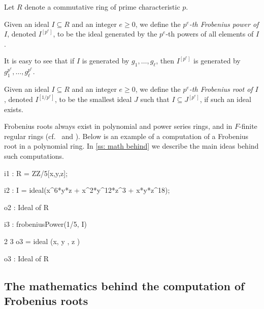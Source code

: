 \documentclass{amsart}
\renewcommand{\geq}{\geqslant}
\begin{document}
Let $R$ denote a commutative ring of prime characteristic $p$.

\begin{definition}
Given an ideal $I\subseteq R$ and an integer $e\geq 0$, we define the \emph{$p^e$-th Frobenius power of $I$}, denoted $I^{[p^e]}$, to be the ideal
generated by the $p^e$-th powers of all elements of $I$.
\end{definition}

It is easy to see that if $I$ is generated by $g_1, \dots, g_\ell$, then $I^{[p^e]}$ is generated by $g_1^{p^e}, \dots, g_\ell^{p^e}$.


\begin{definition}
Given an ideal $I\subseteq R$ and an integer $e\geq 0$, we define the \emph{$p^e$-th Frobenius root of $I$}, denoted $I^{[1/p^{e}]}$, to be the smallest ideal $J$ such that $I\subseteq J^{[p^e]}$, if such an ideal exists.
\end{definition}

Frobenius roots always exist in polynomial and power series rings, and in $F$-finite regular rings
(cf.~\cite[\S 2]{BlickleMustataSmithDiscretenessAndRationalityOfFThresholds} and \cite[\S 5]{KatzmanParameterTestIdealOfCMRings}).
Below is an example of a computation of a Frobenius root in a polynomial ring.
In \autoref{ss: math behind} we describe the main ideas behind such computations.

\medskip
{\small
{}
\begin{MyVerbatim}
i1 : R = ZZ/5[x,y,z];

i2 : I = ideal(x^6*y*z + x^2*y^12*z^3 + x*y*z^18);

o2 : Ideal of R

i3 : frobeniusPower(1/5, I)

                2   3
o3 = ideal (x, y , z )

o3 : Ideal of R
\end{MyVerbatim}
}
\medskip

\subsection{The mathematics behind the computation of Frobenius roots}
\label{ss: math behind}
\end{document}
